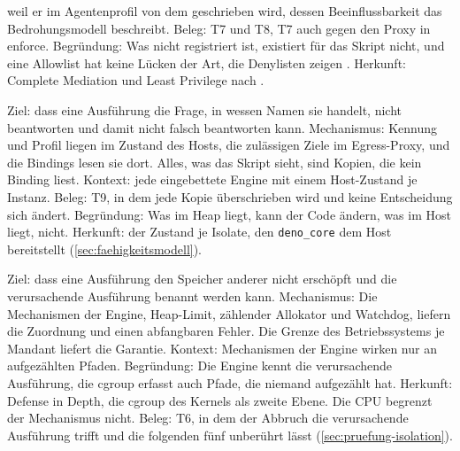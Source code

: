 \begin{description}
    weil er im Agentenprofil von dem geschrieben wird, dessen Beeinflussbarkeit das
    Bedrohungsmodell beschreibt. Beleg: T7 und T8, T7 auch gegen den Proxy in enforce. Begründung: Was nicht registriert ist, existiert für das
    Skript nicht, und eine Allowlist hat keine Lücken der Art, die Denylisten zeigen
    \autocite[S.~1--2]{chen_one_2026}. Herkunft: Complete Mediation und Least Privilege nach
    \textcite[S.~1282]{saltzer_protection_1975}.
  \item[P4 Der Mandantenkontext liegt außerhalb des Heaps.] Ziel: dass eine Ausführung die Frage,
    in wessen Namen sie handelt, nicht beantworten und damit nicht falsch beantworten kann.
    Mechanismus: Kennung und Profil liegen im Zustand des Hosts, die zulässigen Ziele im Egress-Proxy, und die Bindings
    lesen sie dort. Alles, was das Skript sieht, sind Kopien, die kein Binding liest. Kontext:
    jede eingebettete Engine mit einem Host-Zustand je Instanz. Beleg: T9, in dem jede Kopie
    überschrieben wird und keine Entscheidung sich ändert. Begründung: Was im Heap liegt, kann der Code ändern, was
    im Host liegt, nicht. Herkunft: der Zustand je Isolate, den \texttt{deno\_core} dem Host bereitstellt
    (\autoref{sec:faehigkeitsmodell}).
  \item[P5 Ressourcenbegrenzung auf zwei Ebenen.] Ziel: dass eine Ausführung den Speicher
    anderer nicht erschöpft und die verursachende Ausführung benannt werden kann. Mechanismus: Die
    Mechanismen der Engine, Heap-Limit, zählender Allokator und Watchdog, liefern die Zuordnung und
    einen abfangbaren Fehler. Die Grenze des Betriebssystems je Mandant liefert die Garantie.
    Kontext: Mechanismen der Engine wirken nur an aufgezählten Pfaden. Begründung: Die Engine kennt die
    verursachende Ausführung, die cgroup erfasst auch Pfade, die niemand aufgezählt hat. Herkunft: Defense in Depth,
    die cgroup des Kernels \autocite{the_kernel_development_community_control_2026} als zweite Ebene. Die \ac{CPU} begrenzt der Mechanismus
    nicht. Beleg: T6, in dem der
    Abbruch die verursachende Ausführung trifft und die folgenden fünf unberührt lässt (\autoref{sec:pruefung-isolation}).
\end{description}



